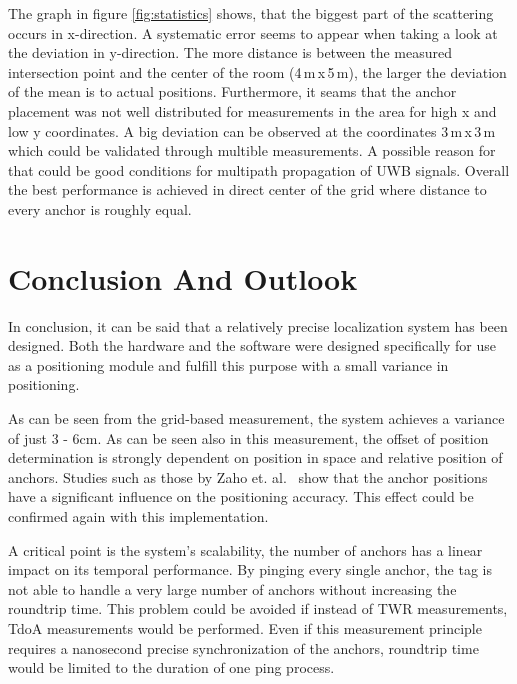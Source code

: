\documentclass[conference, a4paper]{IEEEtran}
\begin{document}
The graph in figure \ref{fig:statistics} shows, that the biggest part of the scattering occurs in x-direction. 
A systematic error seems to appear when taking a look at the deviation in y-direction. 
The more distance is between the measured intersection point and the center of the room (4\,m\,x\,5\,m), the larger the deviation of the mean is to actual positions. 
Furthermore, it seams that the anchor placement was not well distributed for measurements in the area for high x and low y coordinates. 
A big deviation can be observed at the coordinates 3\,m\,x\,3\,m which could be validated through multible measurements.
A possible reason for that could be good conditions for multipath propagation of \ac{UWB} signals.
Overall the best performance is achieved in direct center of the grid where distance to every anchor is roughly equal.



\section{Conclusion And Outlook}\label{section:conclusion}
In conclusion, it can be said that a relatively precise localization system has been designed.
Both the hardware and the software were designed specifically for use as a positioning module
and fulfill this purpose with a small variance in positioning.

As can be seen from the grid-based measurement, the system achieves a variance of just 3 - 6cm.
As can be seen also in this measurement,
the offset of position determination is strongly dependent on position in space
and relative position of anchors.
Studies such as those by Zaho et. al.~\cite{Zhao_2022} show that the anchor positions
have a significant influence on the positioning accuracy.
This effect could be confirmed again with this implementation.

A critical point is the system's scalability, the number of anchors has a linear impact on its temporal performance.
By pinging every single anchor, the tag is not able to handle a very large number of anchors without increasing the roundtrip time.
This problem could be avoided if instead of \ac{TWR} measurements, \ac{TdoA} measurements would be performed.
Even if this measurement principle requires a nanosecond precise synchronization of the anchors,
roundtrip time would be limited to the duration of one ping process.
\end{document}
